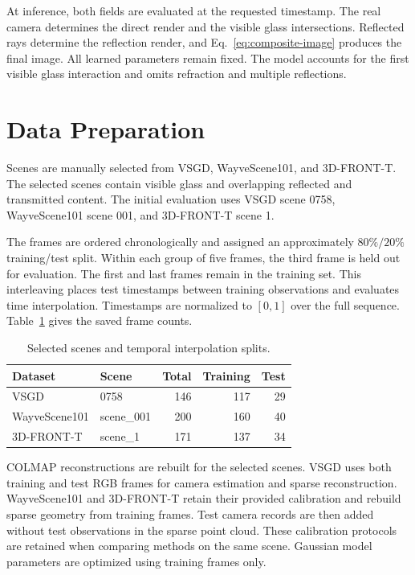 At inference, both fields are evaluated at the requested timestamp. The real camera determines the direct render and the visible glass intersections. Reflected rays determine the reflection render, and Eq.~\eqref{eq:composite-image} produces the final image. All learned parameters remain fixed. The model accounts for the first visible glass interaction and omits refraction and multiple reflections.

\section{Data Preparation}

Scenes are manually selected from VSGD, WayveScene101, and 3D-FRONT-T. The selected scenes contain visible glass and overlapping reflected and transmitted content. The initial evaluation uses VSGD scene 0758, WayveScene101 scene 001, and 3D-FRONT-T scene 1.

The frames are ordered chronologically and assigned an approximately $80\%/20\%$ training/test split. Within each group of five frames, the third frame is held out for evaluation. The first and last frames remain in the training set. This interleaving places test timestamps between training observations and evaluates time interpolation. Timestamps are normalized to $[0,1]$ over the full sequence. Table~\ref{tab:scene-splits} gives the saved frame counts.

\begin{table}[!htbp]
  \centering
  \caption{Selected scenes and temporal interpolation splits.}
  \label{tab:scene-splits}
  \begin{tabular}{@{}llrrr@{}}
    \toprule
    Dataset & Scene & Total & Training & Test\\
    \midrule
    VSGD & 0758 & 146 & 117 & 29\\
    WayveScene101 & scene\_001 & 200 & 160 & 40\\
    3D-FRONT-T & scene\_1 & 171 & 137 & 34\\
    \bottomrule
  \end{tabular}
\end{table}

COLMAP reconstructions are rebuilt for the selected scenes. VSGD uses both training and test RGB frames for camera estimation and sparse reconstruction. WayveScene101 and 3D-FRONT-T retain their provided calibration and rebuild sparse geometry from training frames. Test camera records are then added without test observations in the sparse point cloud. These calibration protocols are retained when comparing methods on the same scene. Gaussian model parameters are optimized using training frames only.

